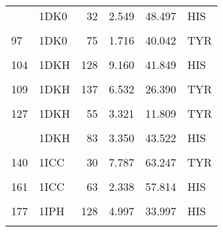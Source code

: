 \begin{table}
\begin{tabular}{llrrrl}
			\addlinespace
			79 & 1DK0 & 32 & 2.549 & 48.497 & HIS\\
			\cellcolor{gray!6}{94} & \cellcolor{gray!6}{1DK0} & \cellcolor{gray!6}{55} & \cellcolor{gray!6}{3.779} & \cellcolor{gray!6}{19.455} & \cellcolor{gray!6}{TYR}\\
			97 & 1DK0 & 75 & 1.716 & 40.042 & TYR\\
			\cellcolor{gray!6}{101} & \cellcolor{gray!6}{1DK0} & \cellcolor{gray!6}{83} & \cellcolor{gray!6}{3.979} & \cellcolor{gray!6}{62.320} & \cellcolor{gray!6}{HIS}\\
			104 & 1DKH & 128 & 9.160 & 41.849 & HIS\\
			\addlinespace
			\cellcolor{gray!6}{106} & \cellcolor{gray!6}{1DKH} & \cellcolor{gray!6}{133} & \cellcolor{gray!6}{7.963} & \cellcolor{gray!6}{28.255} & \cellcolor{gray!6}{HIS}\\
			109 & 1DKH & 137 & 6.532 & 26.390 & TYR\\
			\cellcolor{gray!6}{112} & \cellcolor{gray!6}{1DKH} & \cellcolor{gray!6}{32} & \cellcolor{gray!6}{2.969} & \cellcolor{gray!6}{50.187} & \cellcolor{gray!6}{HIS}\\
			127 & 1DKH & 55 & 3.321 & 11.809 & TYR\\
			\cellcolor{gray!6}{130} & \cellcolor{gray!6}{1DKH} & \cellcolor{gray!6}{75} & \cellcolor{gray!6}{2.303} & \cellcolor{gray!6}{45.976} & \cellcolor{gray!6}{TYR}\\
			\addlinespace
			134 & 1DKH & 83 & 3.350 & 43.522 & HIS\\
			\cellcolor{gray!6}{137} & \cellcolor{gray!6}{1DKH} & \cellcolor{gray!6}{86} & \cellcolor{gray!6}{9.941} & \cellcolor{gray!6}{74.151} & \cellcolor{gray!6}{TYR}\\
			140 & 1ICC & 30 & 7.787 & 63.247 & TYR\\
			\cellcolor{gray!6}{144} & \cellcolor{gray!6}{1ICC} & \cellcolor{gray!6}{39} & \cellcolor{gray!6}{2.907} & \cellcolor{gray!6}{78.752} & \cellcolor{gray!6}{HIS}\\
			161 & 1ICC & 63 & 2.338 & 57.814 & HIS\\
			\addlinespace
			\cellcolor{gray!6}{172} & \cellcolor{gray!6}{1ICC} & \cellcolor{gray!6}{74} & \cellcolor{gray!6}{9.353} & \cellcolor{gray!6}{38.522} & \cellcolor{gray!6}{TYR}\\
			177 & 1IPH & 128 & 4.997 & 33.997 & HIS\\
			\cellcolor{gray!6}{201} & \cellcolor{gray!6}{1IPH} & \cellcolor{gray!6}{212} & \cellcolor{gray!6}{8.210} & \cellcolor{gray!6}{67.518} & \cellcolor{gray!6}{HIS}\\

\end{tabular}
\end{table}
